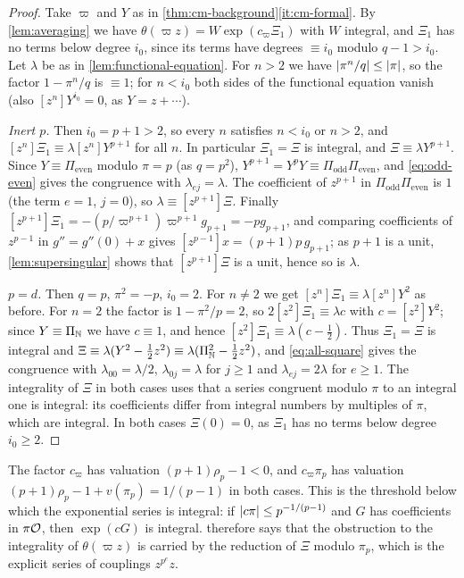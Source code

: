 \begin{proof}
Take $\varpi$ and $Y$ as in \cref{thm:cm-background}\ref{it:cm-formal}. By \cref{lem:averaging}
we have $\theta(\varpi z)=W\exp(c_\varpi\Xi_1)$ with $W$ integral, and $\Xi_1$ has no terms below degree
$i_0$, since its terms have degrees $\equiv i_0$ modulo $q-1>i_0$. Let $\lambda$ be as in
\cref{lem:functional-equation}. For $n>2$ we have $\lvert \pi^n/q\rvert\le\lvert \pi\rvert$, so the factor
$1-\pi^n/q$ is $\equiv1$; for $n<i_0$ both sides of the functional equation vanish (also
$[z^n]Y^{i_0}=0$, as $Y=z+\cdots$).

\emph{Inert $p$.} Then $i_0=p+1>2$, so every $n$ satisfies $n<i_0$ or $n>2$, and
$[z^n]\Xi_1\equiv\lambda[z^n]Y^{p+1}$ for all $n$. In particular $\Xi_1=\Xi$ is integral, and
$\Xi\equiv\lambda Y^{p+1}$. Since $Y\equiv\Pi_{\mathrm{even}}$ modulo $\pi=p$ (as $q=p^2$),
$Y^{p+1}=Y^pY\equiv\Pi_{\mathrm{odd}}\Pi_{\mathrm{even}}$, and \eqref{eq:odd-even} gives the
congruence with $\lambda_{ej}=\lambda$. The coefficient of $z^{p+1}$ in
$\Pi_{\mathrm{odd}}\Pi_{\mathrm{even}}$ is $1$ (the term $e=1$, $j=0$), so $\lambda\equiv[z^{p+1}]\Xi$.
Finally $[z^{p+1}]\Xi_1=-(p/\varpi^{p+1})\varpi^{p+1}g_{p+1}=-pg_{p+1}$, and comparing coefficients of
$z^{p-1}$ in $g''=g''(0)+x$ gives $[z^{p-1}]x=(p+1)p\,g_{p+1}$; as $p+1$ is a unit,
\cref{lem:supersingular} shows that $[z^{p+1}]\Xi$ is a unit, hence so is $\lambda$.

\emph{$p=d$.} Then $q=p$, $\pi^2=-p$, $i_0=2$. For $n\ne2$ we get $[z^n]\Xi_1\equiv\lambda[z^n]Y^2$ as
before. For $n=2$ the factor is $1-\pi^2/p=2$, so $2[z^2]\Xi_1\equiv\lambda c$ with $c=[z^2]Y^2$; since
$Y\equiv\Pi_{\mathbb{N}}$ we have $c\equiv1$, and hence $[z^2]\Xi_1\equiv\lambda(c-\frac12)$. Thus $\Xi_1=\Xi$ is
integral and $\Xi\equiv\lambda(Y^2-\frac12z^2)\equiv\lambda(\Pi_{\mathbb{N}}^2-\frac12z^2)$, and
\eqref{eq:all-square} gives the congruence with $\lambda_{00}=\lambda/2$, $\lambda_{0j}=\lambda$ for
$j\ge1$ and $\lambda_{ej}=2\lambda$ for $e\ge1$. The integrality of $\Xi$ in both cases uses that a
series congruent modulo $\pi$ to an integral one is integral: its coefficients differ from integral numbers by multiples of $\pi$, which are integral. In both cases $\Xi(0)=0$, as $\Xi_1$ has no terms below degree $i_0\ge2$.
\end{proof}

\begin{remark}\label{rem:exponent-size}
The factor $c_\varpi$ has valuation $(p+1)\rho_p-1<0$, and $c_\varpi\pi_p$ has valuation
$(p+1)\rho_p-1+v(\pi_p)=1/(p-1)$ in both cases. This is the threshold below which the exponential
series is integral: if $\lvert c\pi\rvert\le p^{-1/(p-1)}$ and $G$ has coefficients in $\pi\mathcal{O}$, then
$\exp(cG)$ is integral.  therefore says that the obstruction to the integrality
of $\theta(\varpi z)$ is carried by the reduction of $\Xi$ modulo $\pi_p$, which is the explicit
series of couplings $z^{p^e}z$.
\end{remark}
